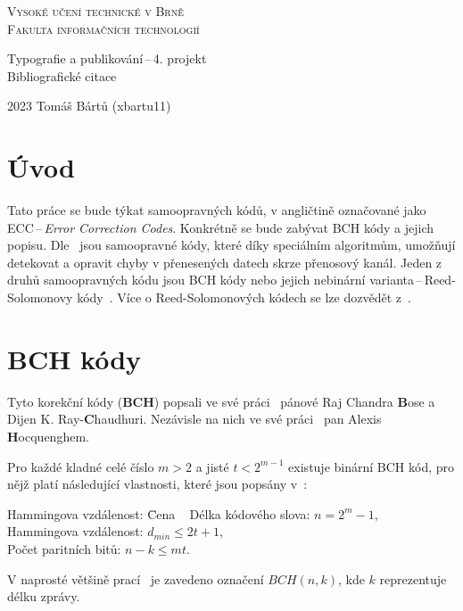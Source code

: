 \documentclass[a4paper,11pt]{article}[06-04-2023]
\begin{document}
\begin{titlepage}
    \begin{center}
        {\Huge \textsc{Vysoké učení technické v Brně}\\[0.5em]
        \huge\textsc{Fakulta informačních technologií}}
        

        {\LARGE Typografie a publikování\,--\,4. projekt\\[0.4em]
        Bibliografické citace}
        
    \end{center}
    { \Large 2023 \hfill Tomáš Bártů (xbartu11) }    
\end{titlepage}

\section*{Úvod}
Tato práce se bude týkat samoopravných kódů, v angličtině označované jako ECC\,--\,\emph{Error Correction Codes}. 
Konkrétně se bude zabývat BCH kódy a jejich popisu. 
Dle~\cite{tutorial} jsou samoopravné kódy, které díky speciálním algoritmům, umožňují detekovat a opravit chyby v přenesených datech skrze přenosový kanál.
Jeden z druhů samoopravných kódu jsou BCH kódy nebo jejich nebinární varianta\,--\,Reed-Solomonovy kódy~\cite{Geeks}. Více o Reed-Solomonových kódech se lze dozvědět z~\cite{RS}.

\section*{BCH kódy}
Tyto korekční kódy (\textbf{BCH}) popsali ve své práci~\cite{BCH} pánové Raj Chandra \textbf{B}ose a Dijen K. Ray-\textbf{C}haudhuri. Nezávisle na nich ve své práci~\cite{BCHFR} pan Alexis \textbf{H}ocquenghem.

Pro každé kladné celé číslo $m > 2$ a jisté $t < 2^{m-1}$ existuje binární BCH kód, pro nějž platí následující vlastnosti, které jsou popsány v~\cite{Shu}: 
\begin{tabbing}
    \qquad Hammingova vzdálenost: \quad \= Cena \quad\            \kill
    \qquad Délka kódového slova:        \> $n = 2^m - 1$,         \\
    \qquad Hammingova vzdálenost:       \> $d_{min} \leq 2t + 1$, \\
    \qquad Počet paritních bitů:        \> $n - k \leq mt$.
\end{tabbing}
V naprosté většině prací~\cite{Shu,Shu2,DP1,DP2} je zavedeno označení $BCH(n, k)$, kde $k$ reprezentuje délku zprávy. 
\end{document}
